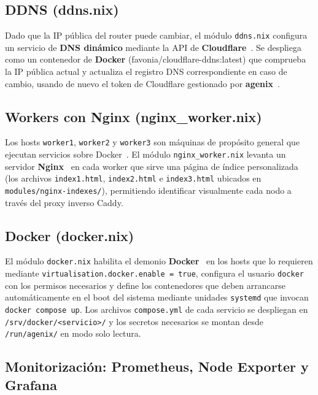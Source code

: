\documentclass[a4paper, 11pt]{article}
\begin{document}
\subsection{DDNS (ddns.nix)}

Dado que la IP pública del router puede cambiar, el módulo \texttt{ddns.nix} configura un servicio de \textbf{DNS dinámico} 
mediante la API de \textbf{Cloudflare}~\cite{cloudflare}. Se despliega como un contenedor de
\textbf{Docker} (favonia/cloudflare-ddns:latest) que comprueba la IP pública actual 
y actualiza el registro DNS correspondiente en caso de cambio, 
usando de nuevo el token de Cloudflare gestionado por \textbf{agenix}~\cite{agenix}.

\subsection{Workers con Nginx (nginx\_worker.nix)}

Los hosts \texttt{worker1}, \texttt{worker2} y \texttt{worker3} son máquinas de propósito general que ejecutan servicios sobre Docker~\cite{docker}. 
El módulo \texttt{nginx\_worker.nix} levanta un servidor \textbf{Nginx}~\cite{nginx} en cada worker que sirve una página 
de índice personalizada (los archivos \texttt{index1.html}, \texttt{index2.html} e \texttt{index3.html} 
ubicados en \texttt{modules/nginx-indexes/}), permitiendo identificar visualmente cada nodo a través del proxy inverso Caddy.

\subsection{Docker (docker.nix)}

El módulo \texttt{docker.nix} habilita el demonio \textbf{Docker}~\cite{docker} en los hosts que lo requieren mediante 
\texttt{virtualisation.docker.enable = true}, configura el usuario \texttt{docker} con los permisos necesarios y 
define los contenedores que deben arrancarse automáticamente en el boot del sistema mediante unidades \texttt{systemd}
que invocan \texttt{docker compose up}. Los archivos \texttt{compose.yml} de cada servicio se despliegan 
en \texttt{/srv/docker/<servicio>/} y los secretos necesarios se montan desde \texttt{/run/agenix/} en modo solo lectura.

\subsection{Monitorización: Prometheus, Node Exporter y Grafana}
\end{document}
